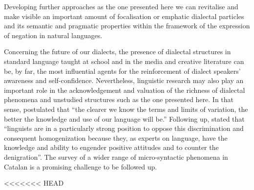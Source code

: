 \documentclass[output=paper]{LSP/langsci}
\begin{document}
Developing further approaches as the one presented here we can revitalise and make visible an important amount of focalisation or emphatic dialectal particles and its semantic and pragmatic properties within the framework of the expression of negation in natural languages.

Concerning the future of our dialects, the presence of dialectal structures in standard language taught at school and in the media and creative literature can be, by far, the most influential agents for the reinforcement of dialect speakers’ awareness and self-confidence. Nevertheless, linguistic research may also play an important role in the acknowledgement and valuation of the richness of dialectal phenomena and unstudied structures such as the one presented here. In that sense, \citet[80]{rigau_variacio_1998} postulated that “the clearer we know the terms and limits of variation, the better the knowledge and use of our language will be.”  Following up, \citet[31]{trudgill_sociolinguistic_2002} stated that “linguists are in a particularly strong position to oppose this discrimination and consequent homogenization because they, as experts on language, have the knowledge and ability to engender positive attitudes and to counter the denigration”. The survey of a wider range of micro-syntactic phenomena in Catalan is a promising challenge to be followed up.

\printbibliography[heading=subbibliography,notkeyword=this]
<<<<<<< HEAD
\end{document}
